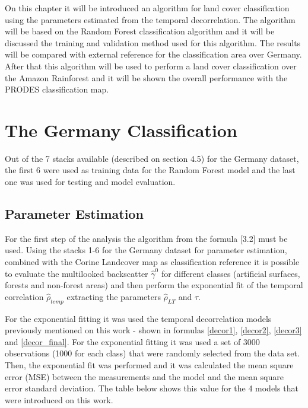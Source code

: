 On this chapter it will be introduced an algorithm for land cover classification using the parameters estimated from the temporal decorrelation. The algorithm will be based on the Random Forest classification algorithm and it will be discussed the training and validation method used for this algorithm. The results will be compared with external reference for the classification area over Germany.
After that this algorithm will be used to perform a land cover classification over the Amazon Rainforest and it will be shown the overall performance with the PRODES classification map.

\section{The Germany Classification}

Out of the 7 stacks available (described on section 4.5) for the Germany dataset, the first 6 were used as training data for the Random Forest model and the last one was used for testing and model evaluation.

\subsection{Parameter Estimation}
For the first step of the analysis the algorithm from the formula [3.2] must be used. Using the stacks 1-6 for the Germany dataset for parameter estimation, combined with the Corine Landcover map as classification reference it is possible to evaluate the multilooked backscatter $\hat{\gamma}^0$ for different classes (artificial surfaces, forests and non-forest areas) and then perform the exponential fit of the temporal correlation $\hat{\rho}_{temp}$ extracting the parameters $\hat{\rho}_{LT}$ and $\hat{\tau}$.

For the exponential fitting it was used the temporal decorrelation models previously mentioned on this work - shown in formulas \ref{decor1}, \ref{decor2}, \ref{decor3} and \ref{decor_final}. For the exponential fitting it was used a set of 3000 observations (1000 for each class) that were randomly selected from the data set. Then, the exponential fit was performed and it was calculated the mean square error (MSE) between the measurements and the model and the mean square error standard deviation. The table below shows this value for the 4 models that were introduced on this work.

